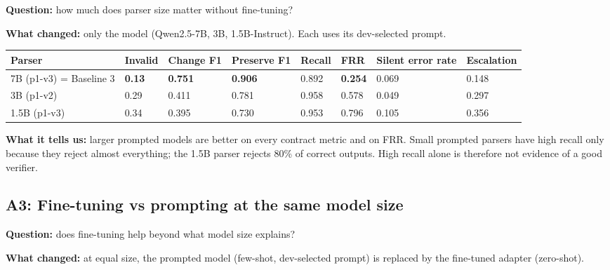 \documentclass[11pt]{article}
\begin{document}
\textbf{Question:} how much does parser size matter without fine-tuning?

\textbf{What changed:} only the model (Qwen2.5-7B, 3B, 1.5B-Instruct).
Each uses its dev-selected prompt.

\begin{table}[!tp]
\centering\scriptsize\setlength{\tabcolsep}{3pt}\renewcommand{\arraystretch}{1.1}
\begin{adjustbox}{max width=\textwidth}\begin{tabular}{llllllll}
\toprule
\textbf{Parser} & \textbf{Invalid} & \textbf{Change F1} & \textbf{Preserve F1} & \textbf{Recall} & \textbf{FRR} & \textbf{Silent error rate} & \textbf{Escalation} \\
\midrule
7B (p1-v3) = Baseline 3 & \textbf{0.13} & \textbf{0.751} & \textbf{0.906} & 0.892 & \textbf{0.254} & 0.069 & 0.148 \\
3B (p1-v2) & 0.29 & 0.411 & 0.781 & 0.958 & 0.578 & 0.049 & 0.297 \\
1.5B (p1-v3) & 0.34 & 0.395 & 0.730 & 0.953 & 0.796 & 0.105 & 0.356 \\
\bottomrule
\end{tabular}\end{adjustbox}
\end{table}

\textbf{What it tells us:} larger prompted models are better on every
contract metric and on FRR. Small prompted parsers have high recall only
because they reject almost everything; the 1.5B parser rejects 80\% of
correct outputs. High recall alone is therefore not evidence of a good
verifier.

\subsection{A3: Fine-tuning vs prompting at the same model size}

\textbf{Question:} does fine-tuning help beyond what model size
explains?

\textbf{What changed:} at equal size, the prompted model (few-shot,
dev-selected prompt) is replaced by the fine-tuned adapter (zero-shot).
\end{document}
